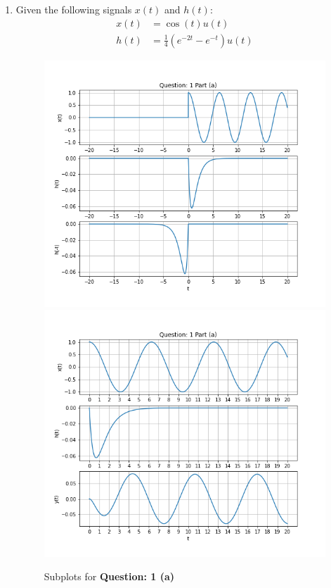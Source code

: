 \documentclass{article}
\begin{document}
    \begin{enumerate}[label=(\alph*)]
        \item Given the following signals $x(t)$ and $h(t)$:
        \begin{align}
            x(t) &= \cos{(t)} u(t) \\
            h(t) &= \frac{1}{4} \left( e^{-2t} - e^{-t} \right) u(t)
        \end{align}

        \begin{figure}[ht]
            \centering
            \includegraphics[scale=0.39]{./Assets/1-a-i.png}
            \includegraphics[scale=0.39]{./Assets/1-a-ii.png}
            \caption*{Subplots for \textbf{Question: 1 (a)}}
        \end{figure}
        \pagebreak


\end{enumerate}
\end{document}
